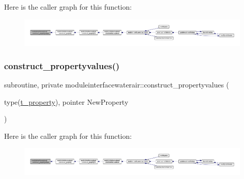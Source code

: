 Here is the caller graph for this function\+:\nopagebreak
\begin{figure}[H]
\begin{center}
\leavevmode
\includegraphics[width=350pt]{namespacemoduleinterfacewaterair_aa99a2e7fefb8e45ed29092e8c068982a_icgraph}
\end{center}
\end{figure}
\mbox{\label{namespacemoduleinterfacewaterair_a564ac080f485dff9d0cc2f92d398f795}} 
\subsubsection{\texorpdfstring{construct\+\_\+propertyvalues()}{construct\_propertyvalues()}}
{\footnotesize\ttfamily subroutine, private moduleinterfacewaterair\+::construct\+\_\+propertyvalues (\begin{DoxyParamCaption}\item[{type(\mbox{\hyperlink{structmoduleinterfacewaterair_1_1t__property}{t\+\_\+property}}), pointer}]{New\+Property }\end{DoxyParamCaption})\hspace{0.3cm}{\ttfamily [private]}}

Here is the caller graph for this function\+:\nopagebreak
\begin{figure}[H]
\begin{center}
\leavevmode
\includegraphics[width=350pt]{namespacemoduleinterfacewaterair_a564ac080f485dff9d0cc2f92d398f795_icgraph}
\end{center}
\end{figure}
\mbox{\label{namespacemoduleinterfacewaterair_a26e91289c0b811bff694b61c7a06fb15}} 
